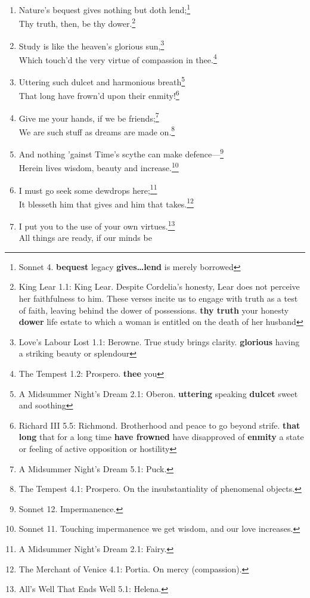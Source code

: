 \documentclass[17pt,twoside]{extarticle}
\begin{document}
\begin{enumerate}
\item
  Nature's bequest gives nothing but doth lend;\footnote{Sonnet 4.
    \textbf{bequest} legacy \textbf{gives\ldots{}lend} is merely
    borrowed}\\Thy truth, then, be thy dower.\footnote{King Lear 1.1:
    King Lear. Despite Cordelia's honesty, Lear does not perceive her
    faithfulness to him. These verses incite us to engage with truth as
    a test of faith, leaving behind the dower of possessions.
    \textbf{thy truth} your honesty \textbf{dower} life estate to which
    a woman is entitled on the death of her husband}
\item
  Study is like the heaven's glorious sun,\footnote{Love's Labour Lost
    1.1: Berowne. True study brings clarity. \textbf{glorious} having a
    striking beauty or splendour}\\Which touch'd the very virtue of
  compassion in thee.\footnote{The Tempest 1.2: Prospero. \textbf{thee}
    you}
\item
  Uttering such dulcet and harmonious breath\footnote{A Midsummer
    Night's Dream 2.1: Oberon. \textbf{uttering} speaking
    \textbf{dulcet} sweet and soothing}\\That long have frown'd upon
  their enmity!\footnote{Richard III 5.5: Richmond. Brotherhood and
    peace to go beyond strife. \textbf{that long} that for a long time
    \textbf{have frowned} have disapproved of \textbf{enmity} a state or
    feeling of active opposition or hostility}
\item
  Give me your hands, if we be friends;\footnote{A Midsummer Night's
    Dream 5.1: Puck.}\\We are such stuff as dreams are made
  on.\footnote{The Tempest 4.1: Prospero. On the insubstantiality of
    phenomenal objects.}
\item
  And nothing 'gainst Time's scythe can make defence---\footnote{Sonnet
    12. Impermanence.}\\Herein lives wisdom, beauty and
  increase.\footnote{Sonnet 11. Touching impermanence we get wisdom, and
    our love increases.}
\item
  I must go seek some dewdrops here;\footnote{A Midsummer Night's Dream
    2.1: Fairy.}\\It blesseth him that gives and him that
  takes.\footnote{The Merchant of Venice 4.1: Portia. On mercy
    (compassion).}
\item
  I put you to the use of your own virtues.\footnote{All's Well That
    Ends Well 5.1: Helena.}\\All things are ready, if our minds be

\end{enumerate}
\end{document}
